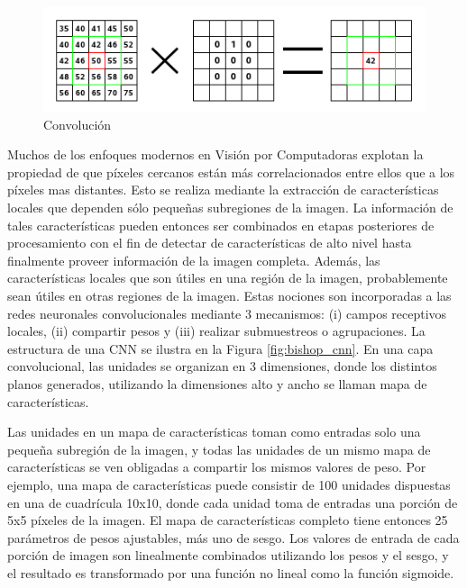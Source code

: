 \documentclass[a4paper,11pt,spanish]{book}
\begin{document}
      \begin{figure}[h]
	\begin{center}
	\includegraphics[width=0.8\linewidth]{./img/convolution.png}
	\end{center}
	\caption{Convolución}
	\label{fig:convolution}
      \end{figure}

      Muchos de los enfoques modernos en Visión por Computadoras explotan la propiedad de que píxeles cercanos están más correlacionados entre ellos 
      que a los píxeles mas distantes. 
      Esto se realiza mediante la extracción de características locales que dependen sólo pequeñas subregiones de la imagen. 
      La información de tales características pueden entonces ser combinados en etapas posteriores de procesamiento con el fin de detectar de características de alto nivel 
      hasta finalmente proveer información de la imagen completa. 
      Además, las características locales que son útiles en una región de la imagen, probablemente sean útiles en otras regiones de la imagen.
      Estas nociones son incorporadas a las redes neuronales convolucionales mediante 3 mecanismos: (i) campos receptivos locales, (ii) compartir pesos y 
      (iii) realizar submuestreos o agrupaciones.
      La estructura de una CNN se ilustra en la Figura \ref{fig:bishop_cnn}. En una capa convolucional, las unidades se organizan en 3 dimensiones, 
      donde los distintos planos generados, utilizando la dimensiones alto y ancho se llaman mapa de características.

      Las unidades en un mapa de características toman como entradas solo una pequeña subregión de la imagen, y todas las unidades de un mismo mapa de características se
      ven obligadas a compartir los mismos valores de peso.
      Por ejemplo, una mapa de características puede consistir de 100 unidades dispuestas en una de cuadrícula 10x10,
      donde cada unidad  toma de entradas una porción de 5x5 píxeles de la imagen.
      El mapa de características completo tiene entonces 25 parámetros de pesos ajustables, más uno de sesgo. 
      Los valores de entrada de cada porción de imagen son linealmente combinados utilizando los pesos y el sesgo, y el resultado es transformado por una función 
      no lineal como la función sigmoide.
\end{document}
